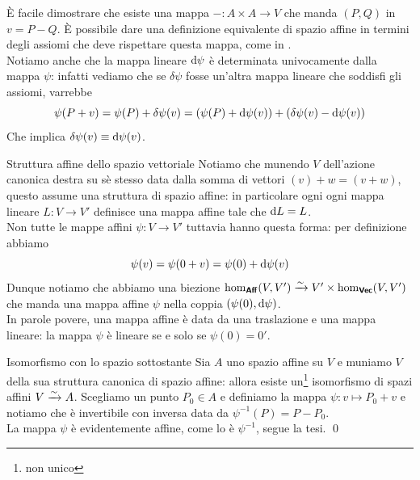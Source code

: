 \documentclass[openany]{book}
\newcommand\affcat{\catname{Aff}}
\begin{document}
È facile dimostrare che esiste una mappa $- : A\times A \to V$ che manda $(P,Q)$ in $v = P-Q$. È possibile dare una definizione equivalente di spazio affine in termini degli assiomi che deve rispettare questa mappa, come in \cite{Moretti2024}.\\
Notiamo anche che la mappa lineare $\text{d}\psi$ è determinata univocamente dalla mappa $\psi$: infatti vediamo che se $\delta\psi$ fosse un'altra mappa lineare che soddisfi gli assiomi, varrebbe
\[ \psi(P+v) = \psi(P)+ \delta\psi(v) = \left(\psi(P)+ \text{d}\psi(v)\right) + \left(\delta\psi(v) - \text{d}\psi(v)\right) \]
Che implica $\delta\psi(v) \equiv \text{d}\psi(v)$.

\begin{example}{Struttura affine dello spazio vettoriale}{}
    Notiamo che munendo $V$ dell'azione canonica destra su sè stesso data dalla somma di vettori $(v)+w = (v+w)$, questo assume una struttura di spazio affine: in particolare ogni ogni mappa lineare $L:V\to V'$ definisce una mappa affine tale che $\text{d} L = L$.\\
    Non tutte le mappe affini $\psi:V\to V'$ tuttavia hanno questa forma: per definizione abbiamo
    \[ \psi(v) = \psi(0+v) = \psi(0) + \text{d}\psi(v) \]
    Dunque notiamo che abbiamo una biezione $\hom_\affcat(V,V') \iso V'\times\hom_\veccat(V,V') $ che manda una mappa affine $\psi$ nella coppia $(\psi(0),\text{d}\psi)$.\\
    In parole povere, una mappa affine è data da una traslazione e una mappa lineare: la mappa $\psi$ è lineare se e solo se $\psi(0) = 0'$.
\end{example}

\begin{proposition}{Isomorfismo con lo spazio sottostante}{}
    Sia $A$ uno spazio affine su $V$ e muniamo $V$ della sua struttura canonica di spazio affine: allora esiste un\footnote{non unico} isomorfismo di spazi affini $V\xrightarrow{\sim} A$.
    \proof 
    Scegliamo un punto $P_0 \in A$ e definiamo la mappa $\psi: v\mapsto P_0+v$ e notiamo che è invertibile con inversa data da $\psi^{-1}(P) = P-P_0$.\\
    La mappa $\psi$ è evidentemente affine, come lo è $\psi^{-1}$, segue la tesi.
    \qed 
\end{proposition}
\end{document}
